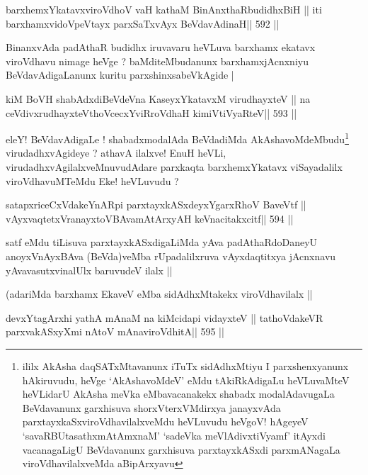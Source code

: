 \begin{shl}
barxhemxYkatavxviroVdhoV vaH kathaM BinAnxthaRbudidhxBiH ||
iti barxhamxvidoVpeVtayx parxSaTxvAyx BeVdavAdinaH\hfill || 592 ||
\end{shl}

\begin{artha}
BinanxvAda padAthaR budidhx iruvavaru heVLuva barxhamx ekatavx
viroVdhavu nimage heVge ? baMditeMbudanunx barxhamxjAcnxniyu
BeVdavAdigaLanunx kuritu parxshinxsabeVkAgide |
\end{artha}

\begin{shl}
kiM BoVH shabAdxdiBeVdeVna KaseyxYkatavxM virudhayxteV ||
na ceVdivxrudhayxteV\s thoVcecxYviRroVdhaH kimiVtiVyaRteV\hfill || 593 ||
\end{shl}

\begin{artha}
eleY! BeVdavAdigaLe ! shabadxmodalAda BeVdadiMda
AkAshavoMdeMbudu\footnote{ililx AkAsha daqSATxMtavanunx iTuTx
  sidAdhxMtiyu I parxshenxyanunx hAkiruvudu, heVge `AkAshavoMdeV' eMdu
  tAkiRkAdigaLu heVLuvaMteV heVLidarU AkAsha meVka eMbavacanakekx
  shabadx modalAdavugaLa BeVdavanunx garxhisuva shorxVterxVMdirxya
  janayxvAda parxtayxkaSxviroVdhavilalxveMdu heVLuvudu heVgoV! hAgeyeV
  `savaRBUtasathxmAtAmxnaM' `sadeVka meVlAdivxtiVyamf' itAyxdi
  vacanagaLigU BeVdavanunx garxhisuva parxtayxkASxdi parxmANagaLa
  viroVdhavilalxveMda aBipArxyavu} virudadhxvAgideye ? athavA ilalxve! EnuH
heVLi, virudadhxvAgilalxveMnuvudAdare parxkaqta barxhemxYkatavx
viSayadalilx viroVdhavuMTeMdu Eke! heVLuvudu ?
\end{artha}

\begin{shl}
satapxriceCxVdakeYnARpi parxtayxkASxdeyxYgarxRhoV BaveVtf ||
vAyxvaqtetxVranayxtoVBAvamAtArxyAH keVnacitakxcitf\hfill || 594 ||
\end{shl}

\begin{artha}
satf eMdu tiLisuva parxtayxkASxdigaLiMda yAva padAthaRdoDaneyU
anoyxVnAyxBAva (BeVda)veMba rUpadalilxruva vAyxdaqtitxya jAcnxnavu
yAvavasutxvinalUlx baruvudeV ilalx ||

(adariMda barxhamx EkaveV eMba sidAdhxMtakekx viroVdhavilalx ||
\end{artha}

\begin{shl}
devxYtagArxhi yathA mAnaM na kiMcidapi vidayxteV ||
tathoVdakeVR parxvakASxyXmi nAtoV mAnaviroVdhitA\hfill || 595 ||
\end{shl}

